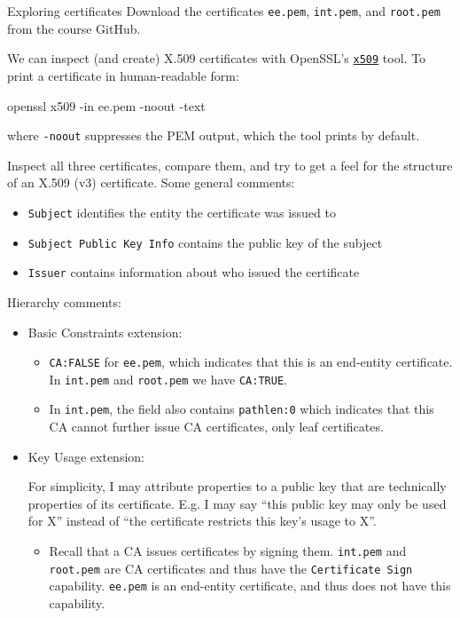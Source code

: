 \documentclass{practice}
\begin{document}
\begin{task}{Exploring certificates}
  Download the certificates \texttt{ee.pem}, \texttt{int.pem}, and \texttt{root.pem} from the course GitHub.

  We can inspect (and create) X.509 certificates with OpenSSL's \href{https://docs.openssl.org/master/man1/openssl-x509/}{\texttt{x509}} tool.
  To print a certificate in human-readable form:
  \begin{cmdblock}
openssl x509 -in ee.pem -noout -text
  \end{cmdblock}
  where \texttt{-noout} suppresses the PEM output, which the tool prints by default.

  Inspect all three certificates, compare them, and try to get a feel for the structure of an X.509 (v3) certificate.
  Some general comments:
  \begin{itemize}
    \item \texttt{Subject} identifies the entity the certificate was issued to
    \item \texttt{Subject Public Key Info} contains the public key of the subject
    \item \texttt{Issuer} contains information about who issued the certificate
  \end{itemize}

  Hierarchy comments:
  \begin{itemize}
    \item Basic Constraints extension:
    \begin{itemize}
      \item \texttt{CA:FALSE} for \texttt{ee.pem}, which indicates that this is an end-entity certificate.
      In \texttt{int.pem} and \texttt{root.pem} we have \texttt{CA:TRUE}.
      \item In \texttt{int.pem}, the field also contains \texttt{pathlen:0} which indicates that this CA cannot further issue CA certificates, only leaf certificates.
    \end{itemize}
    \item Key Usage extension:
    \begin{tcolorbox}[title={Abuse of terminology}]
      For simplicity, I may attribute properties to a public key that are technically properties of its certificate.
      E.g. I may say \enquote{this public key may only be used for X} instead of \enquote{the certificate restricts this key's usage to X}.
    \end{tcolorbox}
    \begin{itemize}
      \item Recall that a CA issues certificates by signing them.
      \texttt{int.pem} and \texttt{root.pem} are CA certificates and thus have the \texttt{Certificate Sign} capability.
      \texttt{ee.pem} is an end-entity certificate, and thus does not have this capability.


\end{itemize}
\end{itemize}
\end{task}
\end{document}
